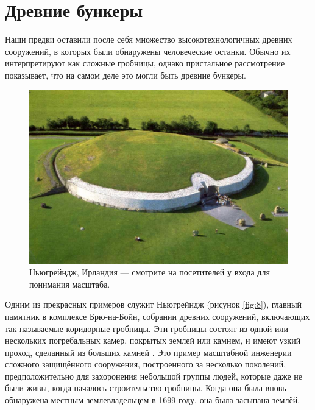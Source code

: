 \documentclass[10pt,twocolumn,letterpaper]{article}
\begin{document}
\section{Древние бункеры}

Наши предки оставили после себя множество высокотехнологичных древних сооружений, в которых были обнаружены человеческие останки. Обычно их интерпретируют как сложные гробницы, однако пристальное рассмотрение показывает, что на самом деле это могли быть древние бункеры.

\begin{figure}[b]
\begin{center}

   \includegraphics[width=1\linewidth]{ww19.jpg}
\end{center}
   \caption{Ньюгрейндж, Ирландия — смотрите на посетителей у входа для понимания масштаба.}
\label{fig:8}
\label{fig:onecol}
\end{figure}

Одним из прекрасных примеров служит Ньюгрейндж (рисунок \ref{fig:8}), главный памятник в комплексе Брю-на-Бойн, собрании древних сооружений, включающих так называемые коридорные гробницы. Эти гробницы состоят из одной или нескольких погребальных камер, покрытых землей или камнем, и имеют узкий проход, сделанный из больших камней \cite{70}. Это пример масштабной инженерии сложного защищённого сооружения, построенного за несколько поколений, предположительно для захоронения небольшой группы людей, которые даже не были живы, когда началось строительство гробницы. Когда она была вновь обнаружена местным землевладельцем в 1699 году, она была засыпана землёй.
\end{document}
